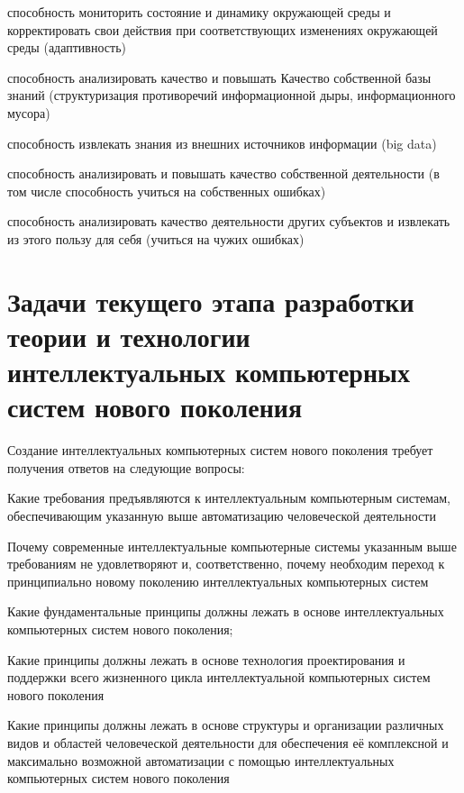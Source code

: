 \begin{SCn}
	\begin{scnitemize}
		\item способность мониторить состояние и динамику окружающей среды и корректировать свои действия при соответствующих изменениях окружающей среды (адаптивность) 
		\item способность анализировать качество и повышать Качество собственной базы знаний (структуризация противоречий информационной дыры, информационного мусора)
		\item способность извлекать знания из внешних источников информации (big data)
		\item способность анализировать и повышать качество собственной деятельности (в том числе способность учиться на собственных ошибках)
		\item способность анализировать качество деятельности других субъектов и извлекать из этого пользу для себя (учиться на чужих ошибках)
	\end{scnitemize}
\end{SCn}

\section*{Задачи текущего этапа разработки теории и технологии интеллектуальных компьютерных систем нового поколения}
\label{concl_tasks_current_stage_theory_and_technology_development}

Создание интеллектуальных компьютерных систем нового поколения требует получения ответов на следующие вопросы:
\begin{textitemize}
	\item Какие требования предъявляются к интеллектуальным компьютерным системам, обеспечивающим указанную выше  автоматизацию человеческой деятельности
	\item Почему современные интеллектуальные компьютерные системы указанным выше требованиям не удовлетворяют и, соответственно, почему необходим переход к принципиально новому поколению интеллектуальных компьютерных систем
	\item Какие фундаментальные принципы должны лежать в основе интеллектуальных компьютерных систем нового поколения;
	\item Какие принципы должны лежать в основе  технология проектирования и поддержки всего жизненного цикла интеллектуальной компьютерных систем нового поколения
	\item Какие принципы должны лежать в основе структуры и организации различных видов и областей человеческой деятельности для обеспечения её комплексной и максимально возможной автоматизации с помощью интеллектуальных компьютерных систем нового поколения
\end{textitemize}

